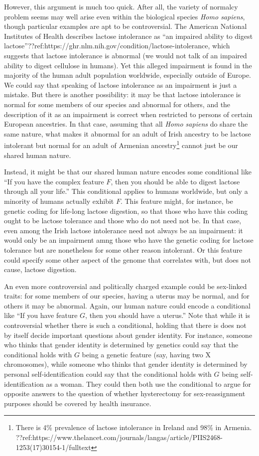 However, this argument is much too quick. After all, the variety of normalcy problem seems may well arise even within the 
biological species \textit{Homo sapiens}, though particular examples are apt to be controversial. The American National
Institutes of Health describes lactose intolerance as ``an impaired ability to digest lactose''??ref:https://ghr.nlm.nih.gov/condition/lactose-intolerance,
which suggests that lactose intolerance is abnormal (we would not talk of an impaired ability to digest cellulose in humans).
Yet this alleged impairment is found in the majority of the human adult population worldwide, especially outside of Europe.
We could say that speaking of lactose intolerance as an impairment is just a mistake. But there is another possibility: it may
be that lactose intolerance is normal for some members of our species and abnormal for others, and the description of it as
an impairment is correct when restricted to persons of certain European ancestries.
In that case, assuming that all \textit{Homo sapiens} do share the same nature, what makes it abnormal for an adult
of Irish ancestry to be lactose intolerant but normal for an adult of Armenian ancestry\footnote{There is 4\% prevalence of
lactose intolerance in Ireland and 98\% in Armenia. ??ref:https://www.thelancet.com/journals/langas/article/PIIS2468-1253(17)30154-1/fulltext }
cannot just be our shared human nature. 

Instead, it might be that our shared human nature encodes some conditional like ``If you have the complex feature $F$, then you
should be able to digest lactose through all your life.'' This conditional applies to humans worldwide, but only a minority of humans
actually exhibit $F$. This feature might, for instance, be genetic coding for life-long lactose digestion, so that those
who have this coding ought to be lactose tolerance and those who do not need not be. In that case, even among the Irish lactose intolerance
need not always be an impairment: it would only be an impairment amng those who have the genetic coding for lactose tolerance but are
nonetheless for some other reason intolerant. Or this feature could specify some other aspect of the genome that correlates with, but
does not cause, lactose digestion.

An even more controversial and politically charged example could be sex-linked traits: for some members of our species, having a uterus may be normal, and for others
it may be abnormal. Again, our human nature could encode a conditional like ``If you have feature $G$, then you should have a uterus.''
Note that while it is controversial whether there is such a conditional, holding that there is does not by itself decide important questions about gender identity.
For instance, someone who thinks that gender identity is determined by genetics could say that the conditional holds with $G$ being a genetic
feature (say, having two X chromosomes), while someone who thinks that gender identity is determined by personal self-identification could say
that the conditional holds with $G$ being self-identification as a woman. They could then both use the conditional to argue for opposite answers
to the question of whether hysterectomy for sex-reassignment purposes should be covered by health insurance. 

